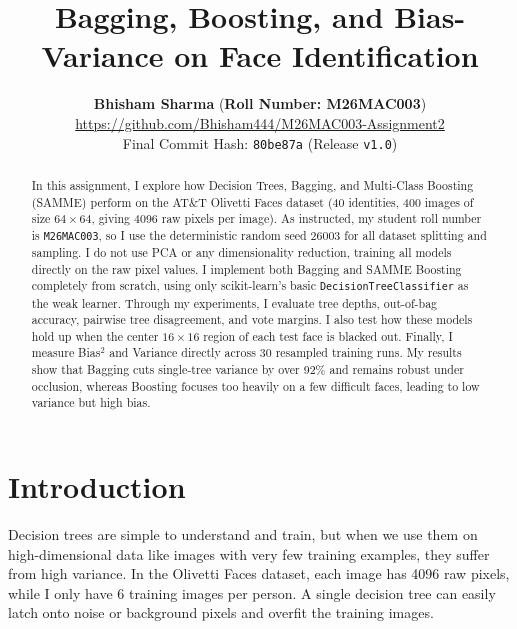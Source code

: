 \documentclass[10pt,twocolumn,letterpaper]{article}
\begin{document}
\title{Bagging, Boosting, and Bias-Variance on Face Identification}

\author{
\textbf{Bhisham Sharma} \quad (\textbf{Roll Number: M26MAC003})\\
\url{https://github.com/Bhisham444/M26MAC003-Assignment2}\\
Final Commit Hash: \texttt{80be87a} (Release \texttt{v1.0})
}

\maketitle

\begin{abstract}
In this assignment, I explore how Decision Trees, Bagging, and Multi-Class Boosting (SAMME) perform on the AT\&T Olivetti Faces dataset (40 identities, 400 images of size $64 \times 64$, giving 4096 raw pixels per image). As instructed, my student roll number is \texttt{M26MAC003}, so I use the deterministic random seed $26003$ for all dataset splitting and sampling. I do not use PCA or any dimensionality reduction, training all models directly on the raw pixel values. I implement both Bagging and SAMME Boosting completely from scratch, using only scikit-learn's basic \texttt{DecisionTreeClassifier} as the weak learner. Through my experiments, I evaluate tree depths, out-of-bag accuracy, pairwise tree disagreement, and vote margins. I also test how these models hold up when the center $16 \times 16$ region of each test face is blacked out. Finally, I measure Bias$^2$ and Variance directly across 30 resampled training runs. My results show that Bagging cuts single-tree variance by over 92\% and remains robust under occlusion, whereas Boosting focuses too heavily on a few difficult faces, leading to low variance but high bias.
\end{abstract}

\section{Introduction}
Decision trees are simple to understand and train, but when we use them on high-dimensional data like images with very few training examples, they suffer from high variance. In the Olivetti Faces dataset, each image has 4096 raw pixels, while I only have 6 training images per person. A single decision tree can easily latch onto noise or background pixels and overfit the training images.
\end{document}
